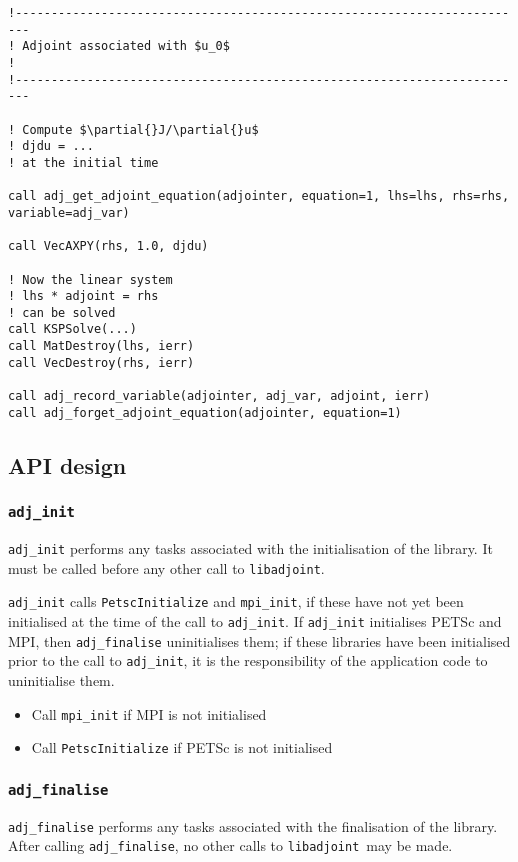 \documentclass[10pt,authoryear]{elsarticle}
\newcommand{\libadjoint}[0]{{\texttt{libadjoint}}}
\begin{document}
\begin{verbatim}
!------------------------------------------------------------------------
! Adjoint associated with $u_0$                                            !
!------------------------------------------------------------------------

! Compute $\partial{}J/\partial{}u$
! djdu = ... 
! at the initial time

call adj_get_adjoint_equation(adjointer, equation=1, lhs=lhs, rhs=rhs, variable=adj_var)

call VecAXPY(rhs, 1.0, djdu)

! Now the linear system
! lhs * adjoint = rhs
! can be solved
call KSPSolve(...)
call MatDestroy(lhs, ierr)
call VecDestroy(rhs, ierr)

call adj_record_variable(adjointer, adj_var, adjoint, ierr)
call adj_forget_adjoint_equation(adjointer, equation=1)
\end{verbatim}

\subsection{API design}
\subsubsection{\texttt{{adj\_init}}}
\texttt{adj\_init} performs any tasks associated with the initialisation of the library.
It must be called before any other call to \libadjoint.

\texttt{adj\_init} calls \texttt{PetscInitialize} and \texttt{mpi\_init}, if these have
not yet been initialised at the time of the call to \texttt{adj\_init}. If \texttt{adj\_init}
initialises PETSc and MPI, then \texttt{adj\_finalise} uninitialises them; if these libraries
have been initialised prior to the call to \texttt{adj\_init}, it is the responsibility of the application 
code to uninitialise them.

\begin{itemize}
\item Call \texttt{mpi\_init} if MPI is not initialised
\item Call \texttt{PetscInitialize} if PETSc is not initialised
\end{itemize}

\subsubsection{\texttt{{adj\_finalise}}}
\texttt{adj\_finalise} performs any tasks associated with the finalisation of the library.
After calling \texttt{adj\_finalise}, no other calls to \libadjoint\ may be made.
\end{document}

